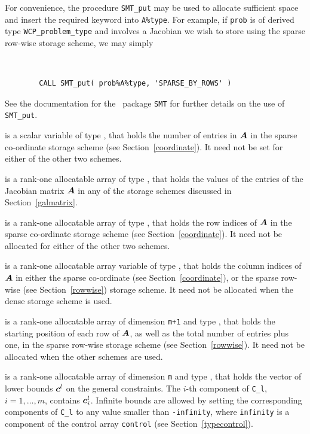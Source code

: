 \documentclass{galahad}
\newcommand{\packagename}{WCP}
\begin{document}
\begin{description}
\begin{description}
For convenience, the procedure {\tt SMT\_put} 
may be used to allocate sufficient space and insert the required keyword
into {\tt A\%type}.
For example, if {\tt prob} is of derived type {\tt \packagename\_problem\_type}
and involves a Jacobian we wish to store using the sparse row-wise 
storage scheme, we may simply
{\tt 
\begin{verbatim}
        CALL SMT_put( prob%A%type, 'SPARSE_BY_ROWS' )
\end{verbatim}
}
\noindent
See the documentation for the \galahad\ package {\tt SMT} 
for further details on the use of {\tt SMT\_put}.

 is a scalar variable of type \integer, that 
holds the number of entries in ${\bm{A}}$
in the sparse co-ordinate storage scheme (see Section~\ref{coordinate}). 
It need not be set for either of the other two schemes.

 is a rank-one allocatable array of type \realdp, that holds
the values of the entries of the Jacobian matrix ${\bm{A}}$ in any of the 
storage schemes discussed in Section~\ref{galmatrix}.

 is a rank-one allocatable array of type \integer,
that holds the row indices of ${\bm{A}}$ in the sparse co-ordinate storage
scheme (see Section~\ref{coordinate}). 
It need not be allocated for either of the other two schemes.

 is a rank-one allocatable array variable of type \integer,
that holds the column indices of ${\bm{A}}$ in either the sparse co-ordinate 
(see Section~\ref{coordinate}), or the sparse row-wise 
(see Section~\ref{rowwise}) storage scheme.
It need not be allocated when the dense storage scheme is used.

 is a rank-one allocatable array of dimension {\tt m+1} and type 
\integer, that holds the 
starting position of each row of ${\bm{A}}$, as well
as the total number of entries plus one, in the sparse row-wise storage
scheme (see Section~\ref{rowwise}). It need not be allocated when the
other schemes are used.

\end{description}

 is a rank-one allocatable array of dimension {\tt m} and type 
\realdp, that holds the vector of lower bounds ${\bm{c}}^{l}$ 
on the general constraints. The $i$-th component of 
{\tt C\_l}, $i = 1, \ldots , m$, contains ${\bm{c}}_{i}^{l}$.
Infinite bounds are allowed by setting the corresponding 
components of {\tt C\_l} to any value smaller than {\tt -infinity}, 
where {\tt infinity} is a component of the control array {\tt control} 
(see Section~\ref{typecontrol}).


\end{description}
\end{document}
